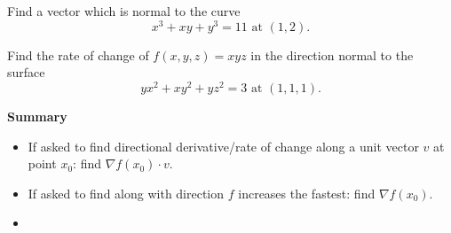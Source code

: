 \documentclass[openany]{book}
\begin{document}
\begin{prob}[2.6, Q6]
Find a vector which is normal to the curve  
\[
x^3 + xy + y^3 = 11 \text{ at } (1, 2).
\]
\end{prob}



\begin{prob}[2.6, Q7]
Find the rate of change of \( f(x, y, z) = xyz \) in the direction normal to the surface  
\[
yx^2 + xy^2 + yz^2 = 3 \text{ at } (1, 1, 1).
\]
\end{prob}

\noindent 
\textbf{Summary}
\begin{itemize}
    \item If asked to find directional derivative/rate of change along a unit vector $v$ at point $x_0$: find $\nabla f(x_0)\cdot v$.
    \item If asked to find along with direction $f$ increases the fastest: find $\nabla f(x_0)$.
    \item 
\end{itemize}
\end{document}
